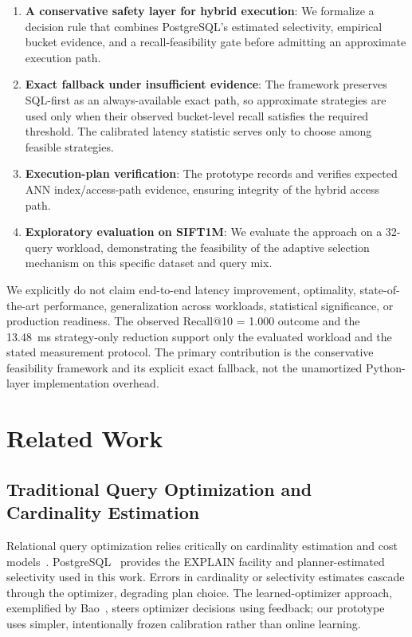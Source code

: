 \documentclass[10pt,twocolumn]{article}
\begin{document}
\begin{enumerate}
\item \textbf{A conservative safety layer for hybrid execution}: We formalize a decision rule that combines PostgreSQL's estimated selectivity, empirical bucket evidence, and a recall-feasibility gate before admitting an approximate execution path.
\item \textbf{Exact fallback under insufficient evidence}: The framework preserves SQL-first as an always-available exact path, so approximate strategies are used only when their observed bucket-level recall satisfies the required threshold. The calibrated latency statistic serves only to choose among feasible strategies.
\item \textbf{Execution-plan verification}: The prototype records and verifies expected ANN index/access-path evidence, ensuring integrity of the hybrid access path.
\item \textbf{Exploratory evaluation on SIFT1M}: We evaluate the approach on a 32-query workload, demonstrating the feasibility of the adaptive selection mechanism on this specific dataset and query mix.
\end{enumerate}

We explicitly do not claim end-to-end latency improvement, optimality, state-of-the-art performance, generalization across workloads, statistical significance, or production readiness. The observed Recall@10 = 1.000 outcome and the 13.48~ms strategy-only reduction support only the evaluated workload and the stated measurement protocol. The primary contribution is the conservative feasibility framework and its explicit exact fallback, not the unamortized Python-layer implementation overhead.

\section{Related Work}
\label{sec:related}

\subsection{Traditional Query Optimization and Cardinality Estimation}

Relational query optimization relies critically on cardinality estimation and cost models~\cite{optimizer_survey}. PostgreSQL~\cite{postgresql16} provides the EXPLAIN facility and planner-estimated selectivity used in this work. Errors in cardinality or selectivity estimates cascade through the optimizer, degrading plan choice. The learned-optimizer approach, exemplified by Bao~\cite{bao}, steers optimizer decisions using feedback; our prototype uses simpler, intentionally frozen calibration rather than online learning.
\end{document}
